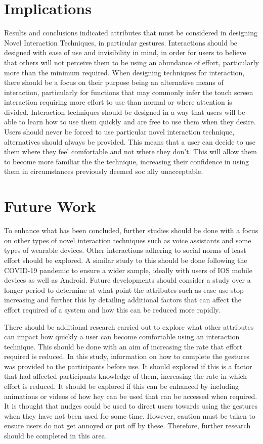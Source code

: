\documentclass{l4proj}
\begin{document}
\section{Implications}
Results and conclusions indicated attributes that must be considered in designing Novel Interaction Techniques, in particular gestures. Interactions should be designed with ease of use and invisibility in mind, in order for users to believe that others will not perceive them to be using an abundance of effort, particularly more than the minimum required. When designing techniques for interaction, there should be a focus on their purpose being an alternative means of interaction, particularly for functions that may commonly infer the touch screen interaction requiring more effort to use than normal or where attention is divided. Interaction techniques should be designed in a way that users will be able to learn how to use them quickly and are free to use them when they desire. Users should never be forced to use particular novel interaction technique, alternatives should always be provided. This means that a user can decide to use them where they feel comfortable and not where they don't. This will allow them to become more familiar the the technique, increasing their confidence in using them in circumstances previously deemed soc ally unacceptable.

\section{Future Work}

To enhance what has been concluded, further studies should be done with a focus on other types of novel interaction techniques such as voice assistants and some types of wearable devices. Other interactions adhering to social norms of least effort should be explored. A similar study to this should be done following the COVID-19 pandemic to ensure a wider sample, ideally with users of IOS mobile devices as well as Android. Future developments should consider a study over a longer period to determine at what point the attributes such as ease use stop increasing and further this by detailing additional factors that can affect the effort required of a system and how this can be reduced more rapidly. 

There should be additional research carried out to explore what other attributes can impact how quickly a user can become comfortable using an interaction technique. This should be done with an aim of increasing the rate that effort required is reduced. In this study, information on how to complete the gestures was provided to the participants before use. It should explored if this is a factor that had affected participants knowledge of them, increasing the rate in which effort is reduced. It should be explored if this can be enhanced by including animations or videos of how hey can be used that can be accessed when required. It is thought that nudges could be used to direct users towards using the gestures when they have not been used for some time. However, caution must be taken to ensure users do not get annoyed or put off by these. Therefore, further research should be completed in this area.
\end{document}
